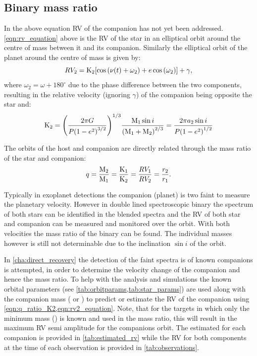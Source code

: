 \subsection{Binary mass ratio}
In the above equation RV of the companion has not yet been addressed.
\cref{eqn:rv_equation} above is the RV of the star in an elliptical orbit around the centre of mass between it and its companion. Similarly the elliptical orbit of the planet around the centre of mass is given by:
\begin{equation}
    {RV_{2}} = \textrm{K}_{2} [\cos{(\nu(t) + \omega_{2})} + e\cos{(\omega_{2})}] + \gamma, \label{eqn:rv2_equation}
\end{equation}
where \(\omega_{2} = \omega + 180^\circ\) due to the phase difference between the two components, resulting in the relative velocity (ignoring $\gamma$) of the companion being opposite the star and:
\begin{equation}
    \textrm{K}_{2}  = {\left(  \frac{2 \pi G}{P{(1 - {e}^{2})}^{3/2}} \right)}^{1/3} \frac{\textrm{M}_{1} \sin{i}}{{(\textrm{M}_{1} + \textrm{M}_{2})}^{2/3}} = \frac{2 \pi a_2 \sin{i}}{P{(1 - {e}^{2})}^{1/2}} \label{eqn:ktwo}
\end{equation}

The orbits of the host and companion are directly related through the mass ratio of the star and companion:
\begin{equation}
q = \frac{\textrm{M}_{2}}{\textrm{M}_{1}} = \frac{\textrm{K}_{1}}{\textrm{K}_{2}} = \frac{RV_{1}}{RV_{2}} = \frac{r_2}{r_1} \label{eqn:q_ratio_K2}.
\end{equation}

Typically in exoplanet detections the companion (planet) is two faint to measure the planetary velocity. However in double lined spectroscopic binary the spectrum of both stars can be identified in the blended spectra and the RV of both star and companion can be measured and monitored over the orbit. With both velocities the mass ratio of the binary can be found. The individual masses however is still not determinable due to the inclination $\sin{i}$ of the orbit.

In \cref{cha:direct_recovery} the detection of the faint spectra is of known companions is attempted, in order to determine the velocity change of the companion and hence the mass ratio. To help with the analysis and simulations the known orbital parameters (see \cref{tab:orbitparams,tab:star_params}) are used along with the companion mass (\Mtwo{} or \Mtwosini{}) to predict or estimate the RV of the companion using \cref{eqn:q_ratio_K2,eqn:rv2_equation}.
Note, that for the targets in which only the minimum mass (\Mtwosini) is known and used in the mass ratio, this will result in the maximum {RV} semi amplitude for the companions orbit.
The estimated \Ktwo{} for each companion is provided in \cref{tab:estimated_rv} while the {RV} for both components at the time of each observation is provided in \cref{tab:observations}.



